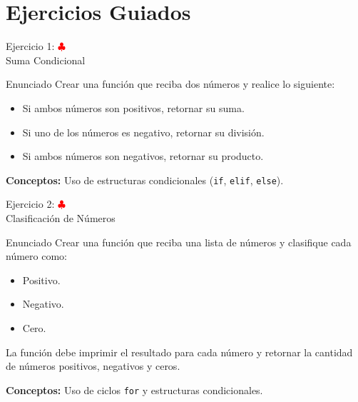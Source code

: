 \documentclass[10pt]{beamer}
\begin{document}
\section{Ejercicios Guiados}

\begin{frame}{Ejercicio 1: \hfill \textcolor{red}{$\clubsuit$} \\ 
Suma Condicional}
  \begin{block}{Enunciado}
    Crear una función que reciba dos números y realice lo siguiente:
    \begin{itemize}
      \item Si ambos números son positivos, retornar su suma.
      \item Si uno de los números es negativo, retornar su división.
      \item Si ambos números son negativos, retornar su producto.
    \end{itemize}
  \end{block}
  \textbf{Conceptos:} Uso de estructuras condicionales (\texttt{if}, \texttt{elif}, \texttt{else}).
\end{frame}

\begin{frame}{Ejercicio 2: \hfill \textcolor{red}{$\clubsuit$} \\ 
Clasificación de Números}
  \begin{block}{Enunciado}
    Crear una función que reciba una lista de números y clasifique cada número como:
    \begin{itemize}
      \item Positivo.
      \item Negativo.
      \item Cero.
    \end{itemize}
    La función debe imprimir el resultado para cada número y retornar la cantidad de números positivos, negativos y ceros.
  \end{block}
  \textbf{Conceptos:} Uso de ciclos \texttt{for} y estructuras condicionales.
\end{frame}
\end{document}
